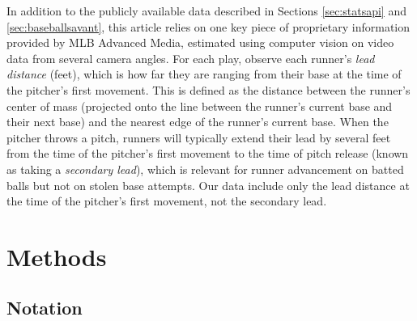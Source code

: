 \documentclass{article}
\begin{document}
      In addition to the publicly available data described in Sections \ref{sec:statsapi} and \ref{sec:baseballsavant}, this article relies on one key piece of proprietary information provided by MLB Advanced Media, estimated using computer vision on video data from several camera angles. For each play, observe each runner's {\it lead distance} (feet), which is how far they are ranging from their base at the time of the pitcher's first movement. This is defined as the distance between the runner's center of mass (projected onto the line between the runner's current base and their next base) and the nearest edge of the runner's current base. When the pitcher throws a pitch, runners will typically extend their lead by several feet from the time of the pitcher's first movement to the time of pitch release (known as taking a {\it secondary lead}), which is relevant for runner advancement on batted balls but not on stolen base attempts. Our data include only the lead distance at the time of the pitcher's first movement, not the secondary lead.

  \section{Methods}

    \subsection{Notation}
\end{document}
